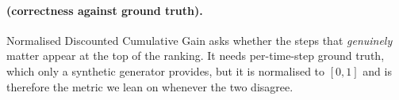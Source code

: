 \paragraph{\ndcg{} (correctness against ground truth).}
Normalised Discounted Cumulative Gain \citep{jarvelin2002ndcg} asks whether the steps that
\emph{genuinely} matter appear at the top of the ranking. It needs per-time-step ground truth, which
only a synthetic generator provides, but it is normalised to $[0,1]$ and is therefore the metric we
lean on whenever the two disagree.
